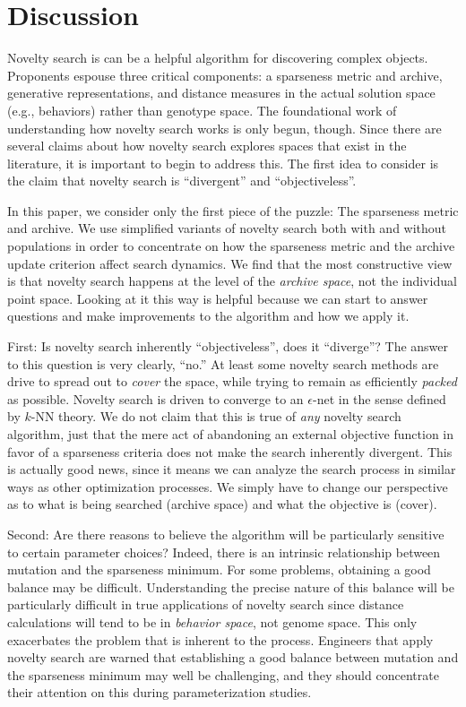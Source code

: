 \documentclass[twoside]{article}
\begin{document}
\section{Discussion}
\label{sec:discussion}

Novelty search is can be a helpful algorithm for discovering complex objects.  Proponents espouse three critical components:  a sparseness metric and archive, generative representations, and distance measures in the actual solution space (e.g., behaviors) rather than genotype space.  The foundational work of understanding how novelty search works is only begun, though.  Since there are several claims about how novelty search explores spaces that exist in the literature, it is important to begin to address this.  The first idea to consider is the claim that novelty search is ``divergent'' and ``objectiveless''.  

In this paper, we consider only the first piece of the puzzle:  The sparseness metric and archive.  We use simplified variants of novelty search both with and without populations in order to concentrate on how the sparseness metric and the archive update criterion affect search dynamics.  We find that the most constructive view is that novelty search happens at the level of the \emph{archive space}, not the individual point space.  Looking at it this way is helpful because we can start to answer questions and make improvements to the algorithm and how we apply it.

First:  Is novelty search inherently ``objectiveless'', does it ``diverge''?  The answer to this question is very clearly, ``no.''   At least some novelty search methods are drive to spread out to \emph{cover} the space, while trying to remain as efficiently \emph{packed} as possible.  Novelty search is driven to converge to an $\epsilon$-net in the sense defined by $k$-NN theory.  We do not claim that this is true of \emph{any} novelty search algorithm, just that the mere act of abandoning an external objective function in favor of a sparseness criteria does not make the search inherently divergent.  This is actually good news, since it means we can analyze the search process in similar ways as other optimization processes.  We simply have to change our perspective as to what is being searched (archive space) and what the objective is (cover).

Second: Are there reasons to believe the algorithm will be particularly sensitive to certain parameter choices?  Indeed, there is an intrinsic relationship between mutation and the sparseness minimum.  For some problems, obtaining a good balance may be difficult.  Understanding the precise nature of this balance will be particularly difficult in true applications of novelty search since distance calculations will tend to be in \emph{behavior space}, not genome space.  This only exacerbates the problem that is inherent to the process.  Engineers that apply novelty search are warned that establishing a good balance between mutation and the sparseness minimum may well be challenging, and they should concentrate their attention on this during parameterization studies.
\end{document}
